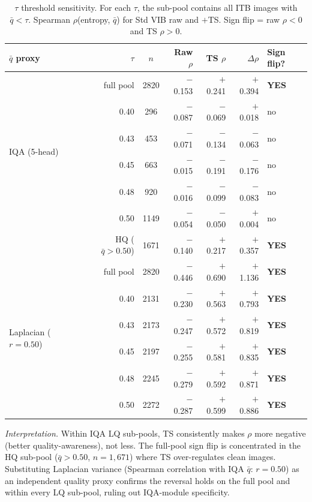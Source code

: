 \documentclass{bmvc2k}
\newcommand{\qbar}{\bar{q}}
\begin{document}
\begin{table}[h]
\centering
\caption{$\tau$ threshold sensitivity. For each $\tau$, the sub-pool contains all ITB images with $\qbar{<}\tau$. Spearman $\rho$(entropy, $\qbar$) for Std VIB raw and $+$TS. Sign flip = raw $\rho{<}0$ and TS $\rho{>}0$.}
\label{tab:tau_sweep}
\footnotesize
\begin{tabular}{lrcrrrl}
\toprule
$\qbar$ proxy & $\tau$ & $n$ & Raw $\rho$ & TS $\rho$ & $\Delta\rho$ & Sign flip? \\
\midrule
\multirow{6}{*}{IQA (5-head)}
  & full pool & 2820 & $-$0.153 & $+$0.241 & $+$0.394 & \textbf{YES} \\
  & 0.40 & 296  & $-$0.087 & $-$0.069 & $+$0.018 & no \\
  & 0.43 & 453  & $-$0.071 & $-$0.134 & $-$0.063 & no \\
  & 0.45 & 663  & $-$0.015 & $-$0.191 & $-$0.176 & no \\
  & 0.48 & 920  & $-$0.016 & $-$0.099 & $-$0.083 & no \\
  & 0.50 & 1149 & $-$0.054 & $-$0.050 & $+$0.004 & no \\
  & HQ ($\qbar{>}0.50$) & 1671 & $-$0.140 & $+$0.217 & $+$0.357 & \textbf{YES} \\
\midrule
\multirow{6}{*}{Laplacian ($r{=}0.50$)}
  & full pool & 2820 & $-$0.446 & $+$0.690 & $+$1.136 & \textbf{YES} \\
  & 0.40 & 2131 & $-$0.230 & $+$0.563 & $+$0.793 & \textbf{YES} \\
  & 0.43 & 2173 & $-$0.247 & $+$0.572 & $+$0.819 & \textbf{YES} \\
  & 0.45 & 2197 & $-$0.255 & $+$0.581 & $+$0.835 & \textbf{YES} \\
  & 0.48 & 2245 & $-$0.279 & $+$0.592 & $+$0.871 & \textbf{YES} \\
  & 0.50 & 2272 & $-$0.287 & $+$0.599 & $+$0.886 & \textbf{YES} \\
\bottomrule
\end{tabular}
\end{table}

\emph{Interpretation.} Within IQA LQ sub-pools, TS consistently makes $\rho$ more negative (better quality-awareness), not less. The full-pool sign flip is concentrated in the HQ sub-pool ($\qbar{>}0.50$, $n{=}1{,}671$) where TS over-regulates clean images. Substituting Laplacian variance (Spearman correlation with IQA $\qbar$: $r{=}0.50$) as an independent quality proxy confirms the reversal holds on the full pool and within every LQ sub-pool, ruling out IQA-module specificity.
\end{document}
